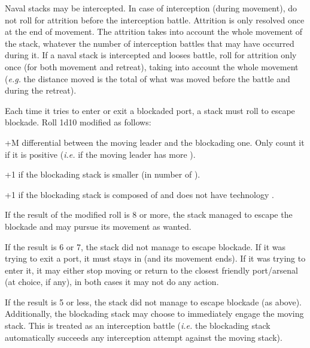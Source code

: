 Naval stacks may be intercepted. In case of interception (during movement), do
not roll for attrition before the interception battle. Attrition is only
resolved once at the end of movement. The attrition takes into account the
whole movement of the stack, whatever the number of interception battles that
may have occurred during it. If a naval stack is intercepted and looses
battle, roll for attrition only once (for both movement and retreat), taking
into account the whole movement (\emph{e.g.} the distance moved is the total
of what was moved before the battle and during the retreat).

Each time it tries to enter or exit a blockaded port, a stack must roll to
escape blockade. Roll 1d10 modified as follows:
\begin{modlist}
\item[+M] \Man differential between the moving leader and the blockading
  one. Only count it if it is positive (\emph{i.e.} if the moving leader has
  more \Man).
\item[+1] if the blockading stack is smaller (in number of \ND).
\item[+1] if the blockading stack is composed of \NWD and does not have
  technology \TSF.
\end{modlist}

If the result of the modified roll is 8 or more, the stack managed to escape
the blockade and may pursue its movement as wanted.

If the result is 6 or 7, the stack did not manage to escape blockade. If it
was trying to exit a port, it must stays in (and its movement ends). If it was
trying to enter it, it may either stop moving or return to the closest
friendly port/arsenal (at choice, if any), in both cases it may not do any
action.

If the result is 5 or less, the stack did not manage to escape blockade (as
above). Additionally, the blockading stack may choose to immediately engage
the moving stack. This is treated as an interception battle (\emph{i.e.} the
blockading stack automatically succeeds any interception attempt against the
moving stack).


